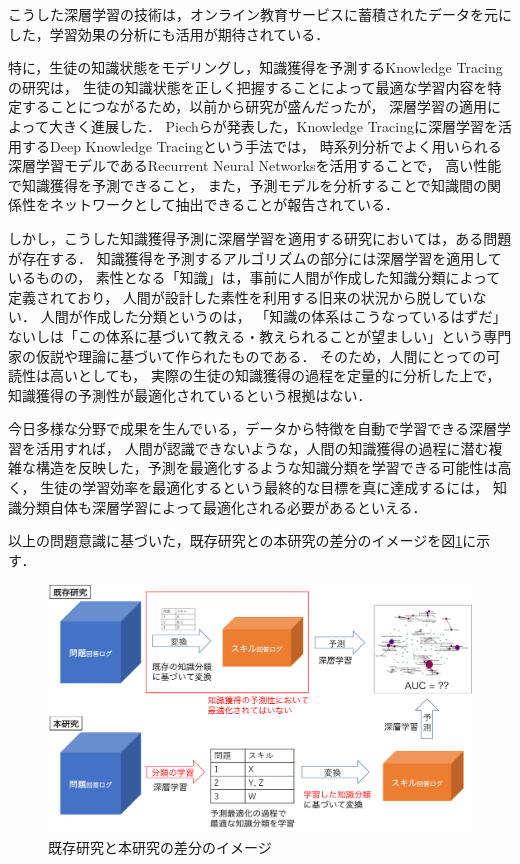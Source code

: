 こうした深層学習の技術は，オンライン教育サービスに蓄積されたデータを元にした，学習効果の分析にも活用が期待されている．

特に，生徒の知識状態をモデリングし，知識獲得を予測するKnowledge Tracingの研究\cite{corbett1994knowledge}は，
生徒の知識状態を正しく把握することによって最適な学習内容を特定することにつながるため，以前から研究が盛んだったが，
深層学習の適用によって大きく進展した．
Piechらが発表した，Knowledge Tracingに深層学習を活用するDeep Knowledge Tracingという手法では，
時系列分析でよく用いられる深層学習モデルであるRecurrent Neural Networks\cite{williams1989learning}を活用することで，
高い性能で知識獲得を予測できること，
また，予測モデルを分析することで知識間の関係性をネットワークとして抽出できることが報告されている\cite{piech2015deep}．


しかし，こうした知識獲得予測に深層学習を適用する研究においては，ある問題が存在する．
知識獲得を予測するアルゴリズムの部分には深層学習を適用しているものの，
素性となる「知識」は，事前に人間が作成した知識分類によって定義されており，
人間が設計した素性を利用する旧来の状況から脱していない．
人間が作成した分類というのは，
「知識の体系はこうなっているはずだ」ないしは「この体系に基づいて教える・教えられることが望ましい」という専門家の仮説や理論に基づいて作られたものである．
そのため，人間にとっての可読性は高いとしても，
実際の生徒の知識獲得の過程を定量的に分析した上で，知識獲得の予測性が最適化されているという根拠はない．

今日多様な分野で成果を生んでいる，データから特徴を自動で学習できる深層学習を活用すれば，
人間が認識できないような，人間の知識獲得の過程に潜む複雑な構造を反映した，予測を最適化するような知識分類を学習できる可能性は高く，
生徒の学習効率を最適化するという最終的な目標を真に達成するには，
知識分類自体も深層学習によって最適化される必要があるといえる．

以上の問題意識に基づいた，既存研究との本研究の差分のイメージを図\ref{fig:problem}に示す．
\begin{figure}[htb]
\begin{center}
\includegraphics[width=350pt]{./img/problem.png}
\end{center}
\caption{既存研究と本研究の差分のイメージ}
\label{fig:problem}
\end{figure}


